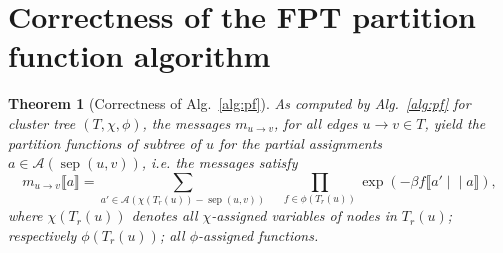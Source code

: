 \documentclass{bioinfo}
\newtheorem{theorem}{Theorem}
\newcommand{\val}{a} %
\newcommand{\separator}[2]{\operatorname{sep}(#1,#2)}
\newcommand{\Message}[2]{m_{#1\rightarrow #2}}
\newcommand{\assignments}{\mathcal{A}}
\newcommand{\evalfor}[2]{#1\llbracket{}#2\rrbracket{}}
\newcommand{\substitute}[2]{#1\!\mid\!\mid\! #2}
\begin{document}
\section{Correctness of the FPT partition function algorithm}
\label{appsec:correctness}

\begin{theorem}[Correctness of Alg.~\ref{alg:pf}]
  \label{the:pfalgo-correctness}
  As computed by Alg.~\ref{alg:pf} for cluster tree $(T,\chi,\phi)$,
  the messages $\Message{u}{v}$, for all edges $u\to{}v\in T$, yield
  the partition functions of subtree of $u$ for the partial
  assignments $\val\in\assignments(\separator{u}{v})$, i.e. the
  messages satisfy
  \begin{equation}
   \evalfor{\Message{u}{v}}{\val} = \sum_{\val'\in\assignments(\chi(T_r(u))-\separator{u}{v})} \quad
   \prod_{f\in\phi(T_r(u))} \exp(-\beta \evalfor{f}{\substitute{\val'}{\val}}),\label{eq:pfalgo-correct}
 \end{equation}
 where $\chi(T_r(u))$ denotes all $\chi$-assigned variables of nodes in $T_r(u)$;
 respectively $\phi(T_r(u))$; all $\phi$-assigned functions.
%
\end{theorem}
\end{document}

